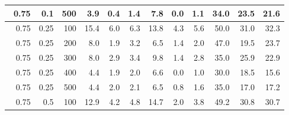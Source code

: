 \begin{longtable}{|r|r|r|r|r|r|r|r|r|r|r|r|}
        \hline \
        0.75                           & 0.1                    & 500                       & 3.9                       & 0.4                       & 1.4                       & 7.8                       & 0.0                       & 1.1                       & 34.0                      & 23.5                      & 21.6                      \\
        \hline \
        0.75                           & 0.25                    & 100                       & 15.4                       & 6.0                       & 6.3                       & 13.8                       & 4.3                       & 5.6                       & 50.0                      & 31.0                      & 32.3                      \\
        \hline \
        0.75                           & 0.25                    & 200                       & 8.0                       & 1.9                       & 3.2                       & 6.5                       & 1.4                       & 2.0                       & 47.0                      & 19.5                      & 23.7                      \\
        \hline \
        0.75                           & 0.25                    & 300                       & 8.0                       & 2.9                       & 3.4                       & 9.8                       & 1.4                       & 2.8                       & 35.0                      & 25.9                      & 22.9                      \\
        \hline \
        0.75                           & 0.25                     & 400                       & 4.4                      & 1.9                       & 2.0                       & 6.6                      & 0.0                       & 1.0                       & 30.0                      & 18.5                      & 15.6                      \\
        \hline \
        0.75                           & 0.25                     & 500                       & 4.4                       & 2.0                       & 2.1                       & 6.5                       & 0.8                       & 1.6                       & 35.0                      & 17.0                      & 17.2                      \\
        \hline \
        0.75                           & 0.5                     & 100                       & 12.9                       & 4.2                       & 4.8                       & 14.7                       & 2.0                       & 3.8                       & 49.2                      & 30.8                      & 30.7                      \\

\end{longtable}
